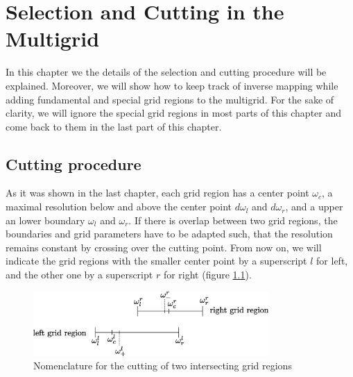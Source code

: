\chapter{Selection and Cutting in the Multigrid} \label{chapter:multigrid_selection_and_cutting}
In this chapter we the details of the selection and cutting procedure will be explained. Moreover, we will show how to keep track of inverse mapping while adding fundamental and special grid regions to the multigrid. For the sake of clarity, we will ignore the special grid regions in most parts of this chapter and come back to them in the last part of this chapter.
\section{Cutting procedure}\label{sec:cutting_procedure}
As it was shown in the last chapter, each grid region has a center point $\omega_c$, a maximal resolution below and above the center point $d\omega_l$ and $d\omega_r$, and a upper an lower boundary $\omega_l$ and $\omega_r$. If there is overlap between two grid regions, the boundaries and grid parameters have to be adapted such, that the resolution remains constant by crossing over the cutting point. From now on, we will indicate the grid regions with the smaller center point by a superscript $l$ for left, and the other one by a superscript $r$ for right (figure \ref{fig:cutting_gr}).

\begin{figure}[h]
	\centering
	\includegraphics[width=0.8\textwidth]{pics/cutting_gr.eps}
	\caption{Nomenclature for the cutting of two intersecting grid regions}
	\label{fig:cutting_gr}
\end{figure}

